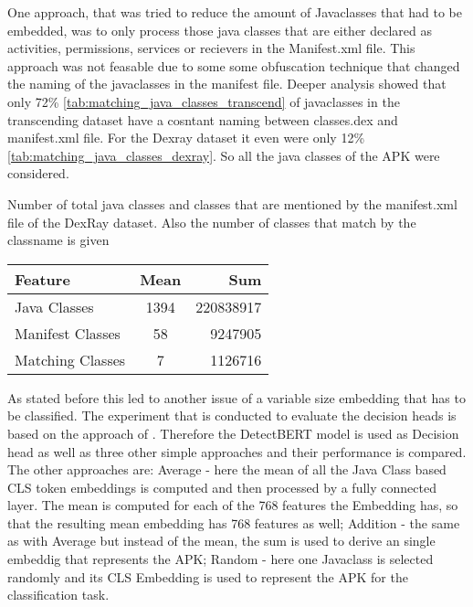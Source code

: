One approach, that was tried to reduce the amount of Javaclasses that had to be embedded, 
was to only process those java classes that are either declared as activities, permissions, services or recievers in the
Manifest.xml file. This approach was not feasable due to some some obfuscation technique that
changed the naming of the javaclasses in the manifest file. Deeper analysis showed
that only 72\% \ref{tab:matching_java_classes_transcend} of javaclasses in the transcending dataset have a cosntant naming
between classes.dex and manifest.xml file. For the Dexray dataset it even were only
12\% \ref{tab:matching_java_classes_dexray}. So all the java classes of the APK were considered.

\begin{margintable}[-5\baselineskip]
    \caption{\label{tab:matching_java_classes_dexray} Number of total java classes and classes that are mentioned by the manifest.xml file of the DexRay dataset. Also the number of classes that match by the classname is given}
    \footnotesize
    \begin{tabular*}{\linewidth}{@{\extracolsep{\fill}} lcr@{}}
        \toprule
        \textbf{Feature} & \textbf{Mean} & \textbf{Sum} \\
        \midrule
        Java Classes & 1394 & 220838917 \\
        Manifest Classes & 58 & 9247905 \\
        Matching Classes & 7 & 1126716 \\
        \bottomrule
    \end{tabular*}
\end{margintable}


As stated before this led to another issue of a variable size embedding that
has to be classified.
The experiment that is conducted to evaluate the decision heads is based on 
the approach of \cite{detectbert}. Therefore the DetectBERT model is used as 
Decision head as well as three other simple approaches and their performance 
is compared.
The other approaches are: Average - here the mean of all the Java Class based
CLS token embeddings is computed and then processed by a fully connected layer.
The mean is computed for each of the 768 features the Embedding has, so that the
resulting mean embedding has 768 features as well;
Addition - the same as with Average but instead of the mean, the sum is used to
derive an single embeddig that represents the APK;
Random - here one Javaclass is selected randomly and its CLS Embedding is used to 
represent the APK for the classification task.

